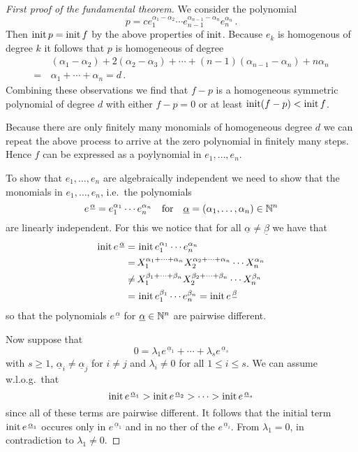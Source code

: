 \begin{proof}[First proof of the fundamental theorem]
  We consider the polynomial
  \[
      p
    =         c
              e_1^{\alpha_1 - \alpha_2}
      \dotsm  e_{n-1}^{\alpha_{n-1} - \alpha_n}
              e_n^{\alpha_n} \,.
  \]
  Then $\operatorname{init} p = \operatorname{init} f$ by the above properties of $\operatorname{init}$.
  Because $e_k$ is homogenous of degree $k$ it follows that $p$ is homogeneous of degree
  \begin{align*}
     &\,  (\alpha_1-\alpha_2) + 2(\alpha_2-\alpha_3) + \dotsb + (n-1)(\alpha_{n-1}-\alpha_n) + n\alpha_n \\
    =&\,  \alpha_1 + \dotsb + \alpha_n
    =     d \,.
  \end{align*}
  Combining these observations we find that $f-p$ is a homogeneous symmetric polynomial of degree $d$ with either $f-p = 0$ or at least $\operatorname{init} (f-p) < \operatorname{init} f$.
  
  Because there are only finitely many monomials of homogeneous degree $d$ we can repeat the above process to arrive at the zero polynomial in finitely many steps.
  Hence $f$ can be expressed as a poylynomial in $e_1, \dotsc, e_n$.
  
  To show that $e_1, \dotsc, e_n$ are algebraically independent we need to show that the monomials in $e_1, \dotsc, e_n$, i.e.\ the polynomials
  \[
      e^{\,\underline{\alpha}}
    = e_1^{\alpha_1} \dotsm e_n^{\alpha_n}
    \quad\text{for}\quad
        \underline{\alpha}
    =   (\alpha_1, \dotsc, \alpha_n)
    \in \mathbb{N}^n
  \]
  are linearly independent.
  For this we notice that for all $\underline{\alpha} \neq \underline{\beta}$ we have that
  \begin{align*}
            \operatorname{init} e^{\,\underline{\alpha}}
       =&\, \operatorname{init} e_1^{\alpha_1} \dotsm e_n^{\alpha_n}   \\
       =&\, X_1^{\alpha_1 + \dotsb + \alpha_n} X_2^{\alpha_2 + \dotsb + \alpha_n} \dotsm X_n^{\alpha_n} \\
    \neq&\, X_1^{\beta_1 + \dotsb + \beta_n}   X_2^{\beta_2  + \dotsb + \beta_n}  \dotsm X_n^{\beta_n}  \\
       =&\, \operatorname{init} e_1^{\beta_1} \dotsm e_n^{\beta_n}
       =    \operatorname{init} e^{\,\underline{\beta}}
  \end{align*}
  so that the polynomials $e^{\,\underline{\alpha}}$ for $\underline{\alpha} \in \mathbb{N}^n$ are pairwise different.
  
  Now suppose that
  \[
      0
    = \lambda_1 e^{\,\underline{\alpha}_1} + \dotsb + \lambda_s e^{\,\underline{\alpha}_s}
  \]
  with $s \geq 1$, $\underline{\alpha}_i \neq \underline{\alpha}_j$ for $i \neq j$ and $\lambda_i \neq 0$ for all $1 \leq i \leq s$.
  We can assume w.l.o.g.\ that 
  \[
      \operatorname{init} e^{\,\underline{\alpha}_1}
    > \operatorname{init} e^{\,\underline{\alpha}_2}
    > \dotsb
    > \operatorname{init} e^{\,\underline{\alpha}_s}
  \]
  since all of these terms are pairwise different.
  It follows that the initial term $\operatorname{init} e^{\,\underline{\alpha}_1}$ occures only in $e^{\,\underline{\alpha}_1}$ and in no ther of the $e^{\,\underline{\alpha}_i}$.
  From $\lambda_1 = 0$, in contradiction to $\lambda_1 \neq 0$.
\end{proof}


